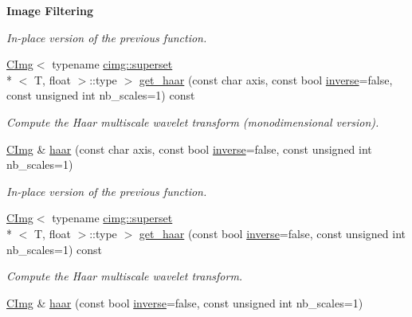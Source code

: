 \begin{Indent}{\bf Image Filtering}
\begin{DoxyCompactItemize}
\begin{DoxyCompactList}\small\item\em In-\/place version of the previous function. \end{DoxyCompactList}\item 
\hyperlink{structcimg__library_1_1_c_img}{C\-Img}$<$ typename \hyperlink{structcimg__library_1_1cimg_1_1superset}{cimg\-::superset}\\*
$<$ T, float $>$\-::type $>$ \hyperlink{structcimg__library_1_1_c_img_a40e6675995caa4b60b1be46a01f631dd}{get\-\_\-haar} (const char axis, const bool \hyperlink{structcimg__library_1_1_c_img_abaeeed53c26e52bb8f518242df202267}{inverse}=false, const unsigned int nb\-\_\-scales=1) const 
\begin{DoxyCompactList}\small\item\em Compute the Haar multiscale wavelet transform (monodimensional version). \end{DoxyCompactList}\item 
\hypertarget{structcimg__library_1_1_c_img_a230eadb96b7d123d408844162ab3d518}{\hyperlink{structcimg__library_1_1_c_img}{C\-Img} \& \hyperlink{structcimg__library_1_1_c_img_a230eadb96b7d123d408844162ab3d518}{haar} (const char axis, const bool \hyperlink{structcimg__library_1_1_c_img_abaeeed53c26e52bb8f518242df202267}{inverse}=false, const unsigned int nb\-\_\-scales=1)}\label{structcimg__library_1_1_c_img_a230eadb96b7d123d408844162ab3d518}

\begin{DoxyCompactList}\small\item\em In-\/place version of the previous function. \end{DoxyCompactList}\item 
\hyperlink{structcimg__library_1_1_c_img}{C\-Img}$<$ typename \hyperlink{structcimg__library_1_1cimg_1_1superset}{cimg\-::superset}\\*
$<$ T, float $>$\-::type $>$ \hyperlink{structcimg__library_1_1_c_img_addf0ce47aab18d0ae2eb9c6fe318599f}{get\-\_\-haar} (const bool \hyperlink{structcimg__library_1_1_c_img_abaeeed53c26e52bb8f518242df202267}{inverse}=false, const unsigned int nb\-\_\-scales=1) const 
\begin{DoxyCompactList}\small\item\em Compute the Haar multiscale wavelet transform. \end{DoxyCompactList}\item 
\hypertarget{structcimg__library_1_1_c_img_ae250eab107c6e07048d2a28a8f23aa91}{\hyperlink{structcimg__library_1_1_c_img}{C\-Img} \& \hyperlink{structcimg__library_1_1_c_img_ae250eab107c6e07048d2a28a8f23aa91}{haar} (const bool \hyperlink{structcimg__library_1_1_c_img_abaeeed53c26e52bb8f518242df202267}{inverse}=false, const unsigned int nb\-\_\-scales=1)}\label{structcimg__library_1_1_c_img_ae250eab107c6e07048d2a28a8f23aa91}


\end{DoxyCompactItemize}
\end{Indent}
